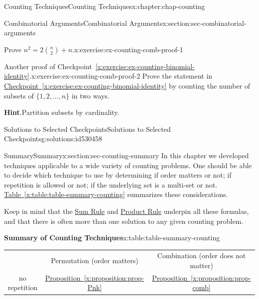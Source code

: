 \documentclass[oneside,10pt,]{book}
\newcommand{\blocktitlefont}{\relax}
\newcommand{\tabularfont}{\relax}
\newcommand{\xreffont}{\relax}
\numberwithin{equation}{section}
\newcommand{\hrulemedium}{\noalign{\hrule height 0.07em}}
\begin{document}
\begin{chapterptx}{Counting Techniques}{}{Counting Techniques}{}{}{x:chapter:chap-counting}
\begin{sectionptx}{Combinatorial Arguments}{}{Combinatorial Arguments}{}{}{x:section:sec-combinatorial-arguments}
\begin{inlineexercise}{Prove \(n^2 = 2\binom{n}{2} + n\).}{x:exercise:ex-counting-comb-proof-1}
\end{inlineexercise}%
\begin{inlineexercise}{Another proof of Checkpoint~{\xreffont\ref*{x:exercise:ex-counting-binomial-identity}}.}{x:exercise:ex-counting-comb-proof-2}%
Prove the statement in \hyperref[x:exercise:ex-counting-binomial-identity]{Checkpoint~{\xreffont\ref{x:exercise:ex-counting-binomial-identity}}} by counting the number of subsets of \(\{1,2,\ldots,n\}\) in two ways.%
\par\smallskip%
\noindent\textbf{\blocktitlefont Hint}.\hypertarget{g:hint:id530456}{}\quad{}Partition subsets by cardinality.%
\end{inlineexercise}%
%
%
\typeout{************************************************}
\typeout{************************************************}
%
\begin{solutions-subsection-numberless}{Solutions to Selected Checkpoints}{}{Solutions to Selected Checkpoints}{}{}{g:solutions:id530458}
\end{solutions-subsection-numberless}
\end{sectionptx}
%
%
\typeout{************************************************}
\typeout{************************************************}
%
\begin{sectionptx}{Summary}{}{Summary}{}{}{x:section:sec-counting-summary}
In this chapter we developed techniques applicable to a wide variety of counting problems. One should be able to decide which technique to use by determining if order matters or not; if repetition is allowed or not; if the underlying set is a multi-set or not. \hyperref[x:table:table-summary-counting]{Table~{\xreffont\ref{x:table:table-summary-counting}}} summarizes these considerations.%
\par
Keep in mind that the \hyperref[x:principle:prin-sum-rule]{Sum Rule} and \hyperref[x:principle:prin-prod-rule]{Product Rule} underpin all these formulas, and that there is often more than one solution to any given counting problem.%
\begin{tableptx}{\textbf{Summary of Counting Techniques}}{x:table:table-summary-counting}{}%
\centering%
{\tabularfont%
\begin{tabular}{ccc}
&Permutation (order matters)&Combination (order does not matter)\tabularnewline\hrulemedium
no repetition&\hyperref[x:proposition:prop-Pnk]{Proposition~{\xreffont\ref{x:proposition:prop-Pnk}}}&\hyperref[x:proposition:prop-comb]{Proposition~{\xreffont\ref{x:proposition:prop-comb}}}\tabularnewline[0pt]

\end{tabular}}
\end{tableptx}
\end{sectionptx}
\end{chapterptx}
\end{document}
